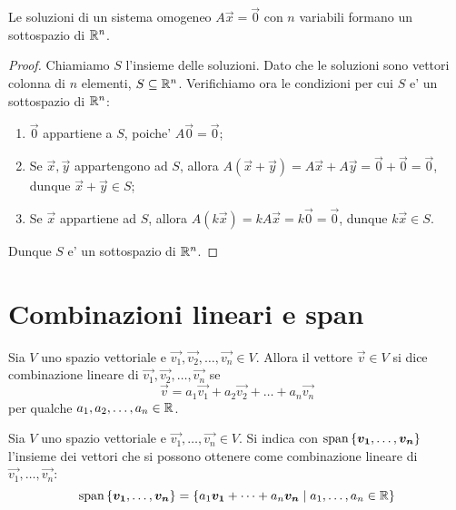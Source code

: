 \begin{proposition}
    Le soluzioni di un sistema omogeneo $A\vec{x} = \vec{0}$ con $n$ variabili formano un sottospazio di $\mathbb{R}^n$.
\end{proposition}
\begin{proof}
    Chiamiamo $S$ l'insieme delle soluzioni. Dato che le soluzioni sono vettori colonna di $n$ elementi, $S \subseteq \mathbb{R}^n$. Verifichiamo ora le condizioni per cui $S$ e' un sottospazio di $\mathbb{R}^n$:
    \begin{enumerate}
        \item $\vec{0}$ appartiene a $S$, poiche' $A\vec{0} = \vec{0}$;
        \item Se $\vec{x}, \vec{y}$ appartengono ad $S$, allora $A(\vec{x} + \vec{y}) = A\vec{x} + A\vec{y} = \vec{0} + \vec{0} = \vec{0}$, dunque $\vec{x} + \vec{y} \in S$;
        \item Se $\vec{x}$ appartiene ad $S$, allora $A(k\vec{x}) = kA\vec{x} = k\vec{0} = \vec{0}$, dunque $k\vec{x} \in S$.
    \end{enumerate}
    Dunque $S$ e' un sottospazio di $\mathbb{R}^n$.
\end{proof}

\section{Combinazioni lineari e span}
\begin{definition}
    Sia $V$ uno spazio vettoriale e $\vec{v_1}, \vec{v_2}, \dots, \vec{v_n} \in V$. Allora il vettore $\vec{v} \in V$ si dice combinazione lineare di $\vec{v_1}, \vec{v_2}, \dots, \vec{v_n}$ se 
    \begin{equation}
        \vec{v}= a_1\vec{v_1} + a_2\vec{v_2} + \dots + a_n\vec{v_n} 
    \end{equation}
    per qualche $a_1, a_2, \dots, a_n \in \mathbb{R}$.
\end{definition}

\begin{definition}[Span]
    Sia $V$ uno spazio vettoriale e $\vec{v_1}, \dots, \vec{v_n} \in V$. Si indica con $\operatorname{span}\left\{\bm{v_1}, \dots, \bm{v_n}\right\}$ l'insieme dei vettori che si possono ottenere come combinazione lineare di $\vec{v_1}, \dots, \vec{v_n}$:
    \begin{equation}
        \operatorname{span}\left\{\bm{v_1}, \dots, \bm{v_n}\right\} = \left\{a_1\bm{v_1} + \dots + a_n\bm{v_n} \mid a_1, \dots, a_n \in \mathbb{R}\right\}
    \end{equation}
\end{definition}

